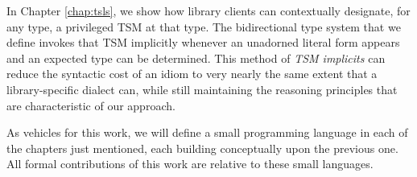 In Chapter \ref{chap:tsls}, we show how library clients can contextually designate, for any type, a privileged TSM at that type. The bidirectional type system that we define  invokes that TSM implicitly whenever an unadorned literal form appears and an expected type can be determined. This method of \emph{TSM implicits} can reduce the syntactic cost of an idiom to very nearly the same extent that a library-specific dialect can, while still maintaining the reasoning principles that are characteristic of our approach.


As vehicles for this work, we will define a small programming language in each of the chapters just mentioned, each building conceptually upon the previous one. All formal contributions of this work are relative to these small languages.

